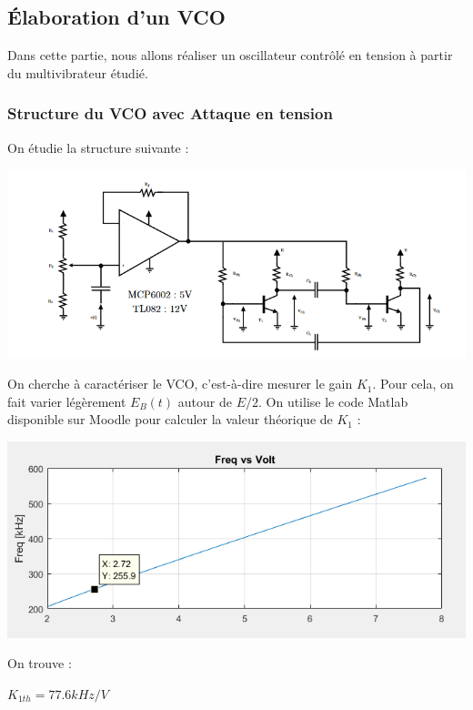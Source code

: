\documentclass[a4paper]{report}
\begin{document}
\subsection{Élaboration d'un VCO}
Dans cette partie, nous allons réaliser un oscillateur contrôlé en tension à partir du multivibrateur étudié.

\subsubsection{Structure du VCO avec Attaque en tension}

On étudie la structure suivante :

\begin{center}
\includegraphics[width=1\textwidth]{VCO_tension.PNG}
\end{center}

On cherche à caractériser le VCO, c'est-à-dire mesurer le gain $K_1$. Pour cela, on fait varier légèrement $E_B (t)$ autour de $E/2$. On utilise le code Matlab disponible sur Moodle pour calculer la valeur théorique de $K_1$ :

\begin{center}
\includegraphics[width=1\textwidth]{K1_th.PNG}
\end{center}

On trouve :

\begin{center}
$K_{1th} = 77.6 kHz/V$
\end{center}
\end{document}
